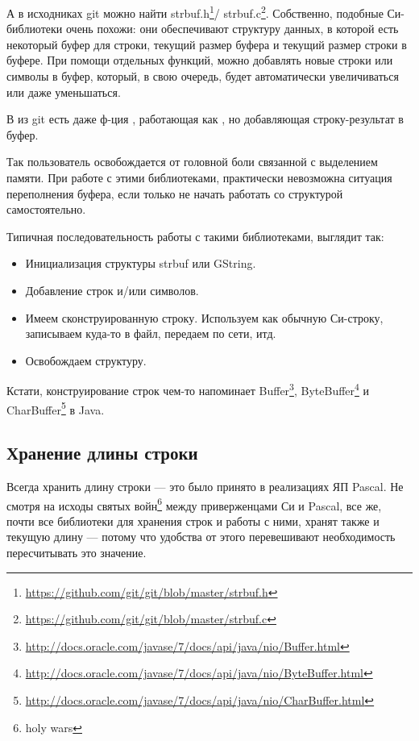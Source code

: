 \label{strbuf}
А в исходниках git можно найти strbuf.h\footnote{\url{https://github.com/git/git/blob/master/strbuf.h}}/
strbuf.c\footnote{\url{https://github.com/git/git/blob/master/strbuf.c}}. Собственно,
подобные Си-библиотеки очень похожи: они обеспечивают структуру данных, в которой есть некоторый буфер для строки, текущий размер буфера
и текущий размер строки в буфере. При помощи отдельных функций, можно добавлять новые строки или символы
в буфер, который, в свою очередь, будет автоматически увеличиваться или даже уменьшаться.

В  из git есть даже ф-ция , работающая как , 
но добавляющая строку-результат в буфер.

Так пользователь освобождается от головной боли связанной с выделением памяти.
При работе с этими библиотеками, практически невозможна ситуация переполнения буфера, если только не начать
работать со структурой самостоятельно.

Типичная последовательность работы с такими библиотеками, выглядит так:

\begin{itemize}
\item
Инициализация структуры strbuf или GString.

\item
Добавление строк и/или символов.

\item
Имеем сконструированную строку. Используем как обычную Си-строку, записываем куда-то в файл, передаем по сети, итд.

\item
Освобождаем структуру.
\end{itemize}

Кстати, конструирование строк чем-то напоминает 
Buffer\footnote{\url{http://docs.oracle.com/javase/7/docs/api/java/nio/Buffer.html}}, 
ByteBuffer\footnote{\url{http://docs.oracle.com/javase/7/docs/api/java/nio/ByteBuffer.html}} и 
CharBuffer\footnote{\url{http://docs.oracle.com/javase/7/docs/api/java/nio/CharBuffer.html}} в Java.

\subsection{Хранение длины строки}

Всегда хранить длину строки --- это было принято в реализациях ЯП Pascal. 
Не смотря на исходы святых войн\footnote{holy wars} между приверженцами Си и Pascal, все же, почти все библиотеки
для хранения строк и работы с ними, хранят также и текущую длину --- потому что удобства от этого перевешивают
необходимость пересчитывать это значение.

